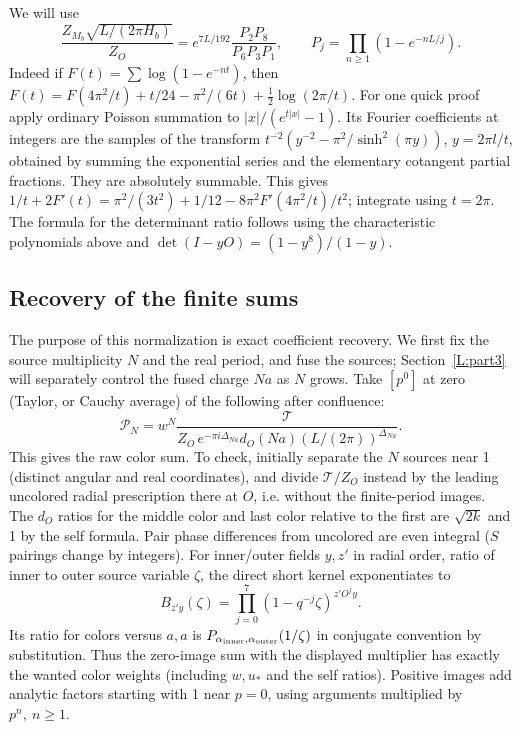 \documentclass[11pt]{article}
\numberwithin{equation}{section}
\theoremstyle{definition}\newtheorem{definition}[theorem]{Definition}
\theoremstyle{remark}\newtheorem{remark}[theorem]{Remark}
\begin{document}
We will use
\[
 \frac{Z_{M_b}\sqrt{L/(2\pi H_b)}}{Z_O}
 = e^{7L/192}\frac{P_2 P_8}{P_6 P_3 P_1},\qquad
 P_j=\prod_{n\ge1}(1-e^{-nL/j}).
\]
Indeed if \(F(t)=\sum\log(1-e^{-nt})\), then \(F(t)=F(4\pi^2/t)+t/24-\pi^2/(6t)+\frac12\log(2\pi/t)\). For one quick proof apply ordinary Poisson summation to \(|x|/(e^{t|x|}-1)\). Its Fourier coefficients at integers are the samples of the transform \(t^{-2}(y^{-2}-\pi^2/\sinh^2(\pi y))\), \(y=2\pi l/t\), obtained by summing the exponential series and the elementary cotangent partial fractions. They are absolutely summable. This gives \(1/t+2F'(t)=\pi^2/(3t^2)+1/12-8\pi^2 F'(4\pi^2/t)/t^2\); integrate using \(t=2\pi\). The formula for the determinant ratio follows using the characteristic polynomials above and \(\det(I-yO)=(1-y^8)/(1-y)\).

\subsection{Recovery of the finite sums}\label{L:step5}

The purpose of this normalization is exact coefficient recovery. We first
fix the source multiplicity $N$ and the real period, and fuse the sources;
Section~\ref{L:part3} will separately control the fused charge $Na$ as
$N$ grows. Take \([p^0]\) at zero (Taylor, or Cauchy average) of the
following after confluence:
\[
 \mathscr P_N= w^N
 \frac{\mathcal T}{Z_O\,e^{-\pi i\Delta_{Na}}d_O(Na)(L/(2\pi))^{\Delta_{Na}}}.
\]
This gives the raw color sum. To check, initially separate the \(N\) sources near 1 (distinct angular and real coordinates), and divide \(\mathcal T/Z_O\) instead by the leading uncolored radial prescription there at \(O\), i.e. without the finite-period images. The \(d_O\) ratios for the middle color and last color relative to the first are \(\sqrt{2k}\) and 1 by the self formula. Pair phase differences from uncolored are even integral (\(S\) pairings change by integers). For inner/outer fields \(y,z'\) in radial order, ratio of inner to outer source variable \(\zeta\), the direct short kernel exponentiates to
\[
 B_{z'y}(\zeta)=\prod_{j=0}^7(1-q^{-j}\zeta)^{z'O^j y}.
\]
Its ratio for colors versus \(a,a\) is \(P_{\alpha_{\rm inner},\alpha_{\rm outer}}(1/\zeta)\) in conjugate convention by substitution. Thus the zero-image sum with the displayed multiplier has exactly the wanted color weights (including \(w,u_*\) and the self ratios). Positive images add analytic factors starting with 1 near \(p=0\), using arguments multiplied by \(p^n,\ n\ge1\).
\end{document}

